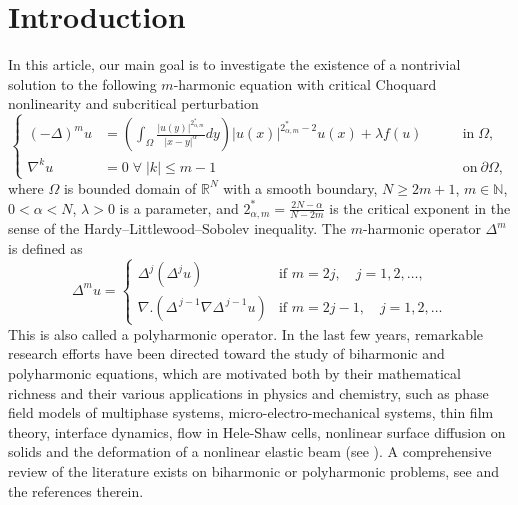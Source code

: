 \documentclass[reqno]{amsart}
\newcommand{\DD} {\displaystyle}
\newcommand{\la} {\lambda}
\newcommand{\Om}{\Omega}
\newcommand{\al} {\alpha}
\newcommand{\noi} {  \noindent}
\newcommand{\mb} {\mathbb}
\numberwithin{theorem}{section} \numberwithin{equation}{section}
\begin{document}
\section{Introduction}
\noi In this article, our main goal is to investigate the existence of a nontrivial solution to the following $m$-harmonic equation with critical Choquard nonlinearity and subcritical perturbation  
\begin{equation}\label{e1}
    \left\{
\begin{aligned}
(-\Delta)^m u &= \left(\DD\int_{\Om}\frac{|u(y)|^{2_{\al,m}^{*}}}{|x-y|^{\al}}dy\right)  {|u(x)|^{2_{\al,m}^{*}-2} u(x)}+ \lambda f(u) \quad \;&& \text{in}\; \Om,\\
 \nabla^k u&=0\; \forall \; |k|\leq m-1&& \text{on}\ \partial\Om,
\end{aligned}\right.
\end{equation}
where $\Om$ is bounded domain of $\mb{R}^N$ with a smooth boundary, $N\geq2m+1$, $m\in \mb{N}$, $0<\al<N$, $\la>0$ is a parameter, and $2_{\al, m}^{*}=\frac{2N-\al}{N-2m}$ is the critical exponent in the sense of the Hardy--Littlewood--Sobolev inequality. The $m$-harmonic operator $\Delta^{m}$ is defined as
\[\Delta^{m} u =
\begin{cases}
\Delta^{j}\left(\Delta^{j} u\right) & \text{if } m = 2j,\quad j = 1,2,\ldots, \\[6pt]
\nabla. (\Delta^{\, j-1} \nabla \Delta^{\, j-1} u)
& \text{if } m = 2j - 1,\quad j = 1, 2, \ldots
\end{cases}\]
\noi This is also called a polyharmonic operator. In the last few years, remarkable research efforts have been directed toward the study of biharmonic and polyharmonic equations, which are motivated both by their mathematical richness and their various applications in physics and chemistry, such as phase field models of multiphase systems, micro-electro-mechanical systems, thin film theory, interface dynamics, 
flow in Hele-Shaw cells, nonlinear surface diffusion on solids and the
deformation of a nonlinear elastic beam (see \cite{23ferrero2009solutions, 24myers1998thin}).
 A comprehensive review of the literature exists on biharmonic or polyharmonic problems, see \cite{31colasuonno2012multiple, 29edmunds1990critical, 35grunau1996conjecture} and the references therein.
\end{document}

